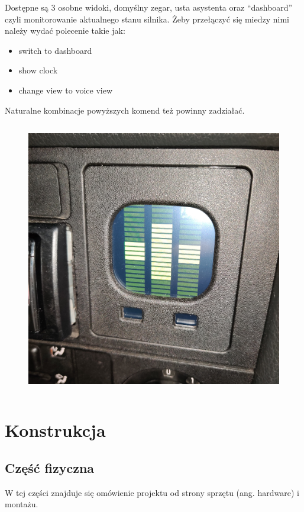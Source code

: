 \documentclass[declaration,shortabstract, inz]{iithesis}
\begin{document}
Dostępne są 3 osobne widoki, domyślny zegar, usta asystenta oraz ``dashboard'' czyli monitorowanie aktualnego stanu silnika. Żeby przełączyć się miedzy nimi należy wydać polecenie takie jak:
\begin{itemize}
  \item switch to dashboard
  \item show clock
  \item change view to voice view
\end{itemize}
Naturalne kombinacje powyższych komend też powinny zadziałać.


\begin{figure}[htp]
    \centering
    \includegraphics[width=12cm, height=12cm]{images/cocpit_voice.jpg}
    \label{fig:cocpit_voice}
\end{figure}


\chapter{Konstrukcja}
\section{Część fizyczna}
W tej części znajduje się omówienie projektu od strony sprzętu (ang. hardware) i montażu.
\end{document}
